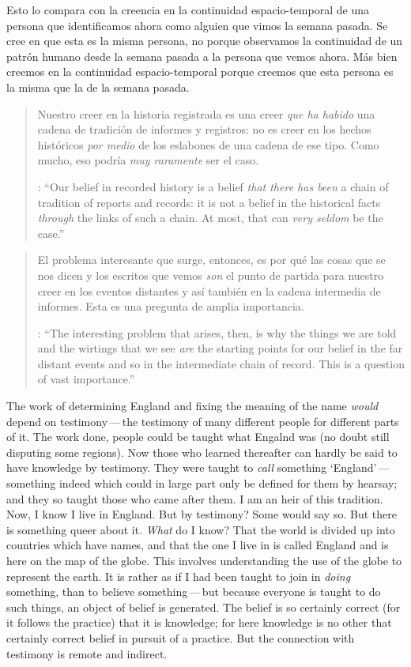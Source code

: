 Esto lo compara con la creencia en la continuidad espacio-temporal de una persona que identificamos ahora como alguien que vimos la semana pasada. Se cree en que esta es la misma persona, no porque observamos la continuidad de un patrón humano desde la semana pasada a la persona que vemos ahora. Más bien creemos en la continuidad espacio-temporal porque creemos que esta persona es la misma que la de la semana pasada.

\blockquote[{\cite[121--122]{anscombe2011plato:humecaus}}: \enquote{Our belief in recorded history is a belief \emph{that there has been} a chain of tradition of reports and records: it is not a belief in the historical facts \emph{through} the links of such a chain. At most, that can \emph{very seldom} be the case.}]{Nuestro creer en la historia registrada es una creer \emph{que ha habido} una cadena de tradición de informes y registros: no es creer en los hechos históricos \emph{por medio} de los eslabones de una cadena de ese tipo. Como mucho, eso podría \emph{muy raramente} ser el caso.}

\blockquote[{\cite[121--122]{anscombe2011plato:humecaus}}: \enquote{The interesting problem that arises, then, is why the things we are told and the wirtings that we see \emph{are} the starting points for our belief in the far distant events and so in the intermediate chain of record. This is a question of vast importance.}]{El problema interesante que surge, entonces, es por qué las cosas que se nos dicen y los escritos que vemos \emph{son} el punto de partida para nuestro creer en los eventos distantes y así también en la cadena intermedia de informes. Esta es una pregunta de amplia importancia.}




  The work of determining England and fixing the meaning of the name \emph{would} depend on testimony\,---\,the testimony of many different people for different parts of it. The work done, people could be taught what Engalnd was (no doubt still disputing some regions). Now those who learned thereafter can hardly be said to have knowledge by testimony. They were taught to \emph{call} something `England'\,---\,something indeed which could in large part only be defined for them by hearsay; and they so taught those who came after them. I am an heir of this tradition. Now, I know I live in England. But by testimony? Some would say so. But there is something queer about it. \emph{What} do I know? That the world is divided up into countries which have names, and that the one I live in is called England and is here on the map of the globe. This involves understanding the use of the globe to represent the earth. It is rather as if I had been taught to join in \emph{doing} something, than to believe something\,---\,but because everyone is taught to do such things, an object of belief is generated. The belief is so certainly correct (for it follows the practice) that it is knowledge; for here knowledge is no other that certainly correct belief in pursuit of a practice. But the connection with testimony is remote and indirect.
